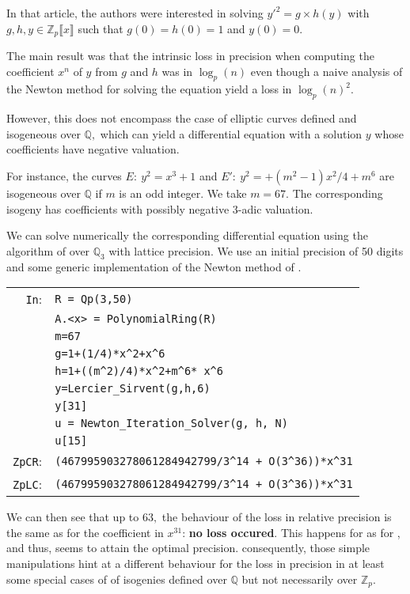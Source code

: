 \documentclass[sigconf]{acmart}
\newcommand{\ZpCR}{\text{\rm \tt ZpCR}\xspace}
\newcommand{\ZpLC}{\text{\rm \tt ZpLC}\xspace}
\newcommand{\cIn}{{\color{blue} \tt \phantom{Zp}In}:}
\newcommand{\cZpCR}{{\color{red} \tt ZpCR}:}
\newcommand{\cZpLC}{{\color{red} \tt ZpLC}:}
\theoremstyle{definition}
\begin{document}
In that article, the authors were interested in
solving $y'^2=g \times h(y)$ with
$g,h,y \in \mathbb{Z}_p \llbracket x \rrbracket$
such that $g(0)=h(0)=1$ and $y(0)=0.$

The main result was that the intrinsic loss in precision
when computing the coefficient $x^n$ of $y$
from $g$ and $h$ was in $\log_p(n)$
even though a naive analysis of
the Newton method for solving the equation
yield a loss in $\log_p(n)^2.$

However, this does not encompass the case of 
elliptic curves defined and isogeneous 
over $\mathbb{Q},$ which can yield a differential 
equation with a solution $y$ whose coefficients
have negative valuation.

For instance, the curves 
$E: \: y^2=x^3+1$
and $E': \: y^2=+ (m^2-1)x^2/4 + m^6$ are isogeneous
over $\mathbb{Q}$ if  $m$ is an odd integer.
We take $m=67.$ The corresponding isogeny has coefficients with possibly
negative $3$-adic valuation.

We can solve numerically 
the corresponding differential equation
using the algorithm of \cite{Lercier-Sirvent:08}
over $\mathbb{Q}_3$ with lattice precision.
We use an initial precision of 50 digits
and some generic implementation of the Newton
method of \cite{Lercier-Sirvent:08}.



\begin{tabular}{rl}
\cIn
 & \verb?R = Qp(3,50)? \\
 & \verb?A.<x> = PolynomialRing(R)? \\
 & \verb?m=67? \\
 & \verb?g=1+(1/4)*x^2+x^6? \\
 & \verb?h=1+((m^2)/4)*x^2+m^6* x^6? \\
 & \verb?y=Lercier_Sirvent(g,h,6)? \\
 & \verb?y[31]? \\
 & \verb?u = Newton_Iteration_Solver(g, h, N)? \\
 & \verb?u[15]? \\
\cZpCR
 & \verb?(467995903278061284942799/3^14 + O(3^36))*x^31? \\
\cZpLC
 & \verb?(467995903278061284942799/3^14 + O(3^36))*x^31? \\
\end{tabular}


We can then see that up to $63,$ the behaviour
of the loss in relative precision is the same
as for the coefficient in $x^{31}$: \textbf{no loss
occured}. This happens for \ZpCR as for \ZpLC,
and thus, \ZpCR seems to attain the optimal precision.
consequently, those simple manipulations
hint at a different behaviour for the loss 
in precision in at least some special cases of
of isogenies defined over $\mathbb{Q}$
but not necessarily over $\mathbb{Z}_p.$ 



\end{document}
